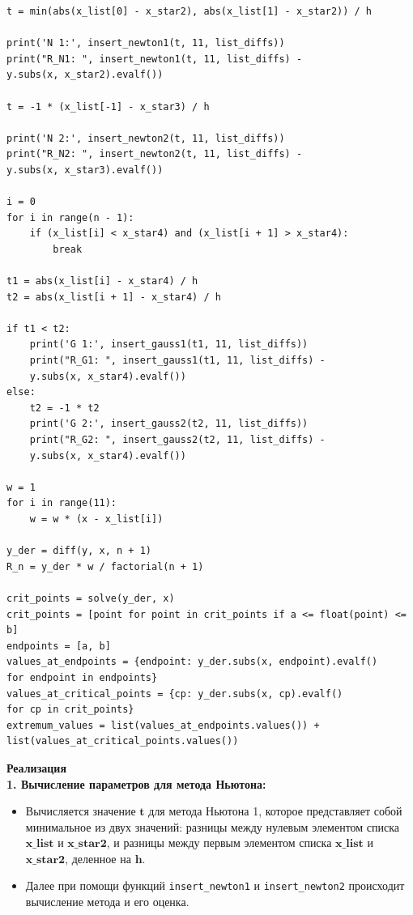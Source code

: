 \documentclass{article}
\begin{document}
\begin{lstlisting}
t = min(abs(x_list[0] - x_star2), abs(x_list[1] - x_star2)) / h

print('N 1:', insert_newton1(t, 11, list_diffs))
print("R_N1: ", insert_newton1(t, 11, list_diffs) - 
y.subs(x, x_star2).evalf())

t = -1 * (x_list[-1] - x_star3) / h

print('N 2:', insert_newton2(t, 11, list_diffs))
print("R_N2: ", insert_newton2(t, 11, list_diffs) -
y.subs(x, x_star3).evalf())

i = 0
for i in range(n - 1):
    if (x_list[i] < x_star4) and (x_list[i + 1] > x_star4):
        break

t1 = abs(x_list[i] - x_star4) / h
t2 = abs(x_list[i + 1] - x_star4) / h

if t1 < t2:
    print('G 1:', insert_gauss1(t1, 11, list_diffs))
    print("R_G1: ", insert_gauss1(t1, 11, list_diffs) -
    y.subs(x, x_star4).evalf())
else:
    t2 = -1 * t2
    print('G 2:', insert_gauss2(t2, 11, list_diffs))
    print("R_G2: ", insert_gauss2(t2, 11, list_diffs) - 
    y.subs(x, x_star4).evalf())

w = 1
for i in range(11):
    w = w * (x - x_list[i])

y_der = diff(y, x, n + 1)
R_n = y_der * w / factorial(n + 1)

crit_points = solve(y_der, x)
crit_points = [point for point in crit_points if a <= float(point) <= b]
endpoints = [a, b]
values_at_endpoints = {endpoint: y_der.subs(x, endpoint).evalf() 
for endpoint in endpoints}
values_at_critical_points = {cp: y_der.subs(x, cp).evalf() 
for cp in crit_points}
extremum_values = list(values_at_endpoints.values()) +
list(values_at_critical_points.values())
\end{lstlisting} 
\textbf{Реализация} \\
\textbf{1. Вычисление параметров для метода Ньютона:}
\begin{itemize}
    \item Вычисляется значение $ \mathbf{t} $ для метода Ньютона 1, которое представляет собой минимальное из двух значений: разницы между нулевым элементом списка $ \mathbf{x\_list} $ и $ \mathbf{x\_star2} $, и разницы между первым элементом списка $ \mathbf{x\_list} $ и $ \mathbf{x\_star2} $, деленное на $ \mathbf{h} $.
    \item Далее при помощи функций \texttt{insert\_newton1} и \texttt{insert\_newton2} происходит вычисление метода и его оценка.
\end{itemize}
\end{document}
